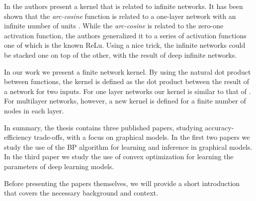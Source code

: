  

In  \cite{cho2009kernel} the authors present a kernel that is related to infinite networks.
It has been shown that the \textit{arc-cosine} function is related to a one-layer network with an infinite number of units  \cite{williams1998computation}.
While the \textit{arc-cosine} is related to the zero-one activation function, the authors generalized it to a series of activation functions one of which is the known ReLu.
Using a nice trick, the infinite networks could be stacked one on top of the other, with the result of deep infinite networks.

In our work  \cite{heinemann2016improper} we present a finite network kernel.
By using the natural dot product between functions, the kernel is defined as the dot product between the result of a network for two inputs.
For one layer networks our kernel is similar to that of  \cite{cho2009kernel}.
For multilayer networks, however, a new kernel is defined for a finite number of nodes in each layer.

In summary, the thesis contains three published papers, studying accuracy-efficiency trade-offs, with a focus on graphical models. In the first two papers we study the use of the BP algorithm for learning and inference in graphical models. In the third paper we study the use of convex optimization for learning the parameters of deep learning models. 

Before presenting the papers themselves, we will provide a short introduction that covers the necessary background and context.
 

